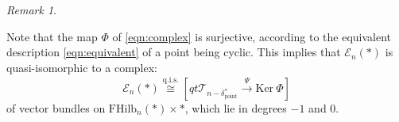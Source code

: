 \documentclass[12pt]{amsart}
\numberwithin{equation}{section}
\theoremstyle{definition}
\theoremstyle{remark}
\newtheorem{remark}[theorem]{Remark}
\newcommand{\CC}{\mathbb{C}}
\newcommand{\CE}{\mathcal{E}}
\newcommand{\CT}{\mathcal{T}}
\renewcommand{\1}{\mathbf{1}}
\newcommand{\FH}{\mathrm{FHilb}}
\newcommand{\qis}{\mathrm{q.i.s.}}
\newcommand{\point}{\mathrm{point}}
\newcommand{\Ker}{\text{Ker}}
\begin{document}



\begin{remark}
\label{rem:surjective}

Note that the map $\Phi$ of \eqref{eqn:complex} is surjective, according to the equivalent description \eqref{eqn:equivalent} of a point being cyclic. This implies that $\CE_n(*)$ is quasi-isomorphic to a complex:
\begin{equation}
\label{eqn:two step}
\CE_n(*) \stackrel{\qis}\cong \left[ qt \CT_{n-\delta_\point^*} \stackrel{\Psi}\longrightarrow \Ker \ \Phi \right]
\end{equation}
of vector bundles on $\FH_n(*) \times *$, which lie in degrees $-1$ and $0$.

\end{remark}

\end{document}
